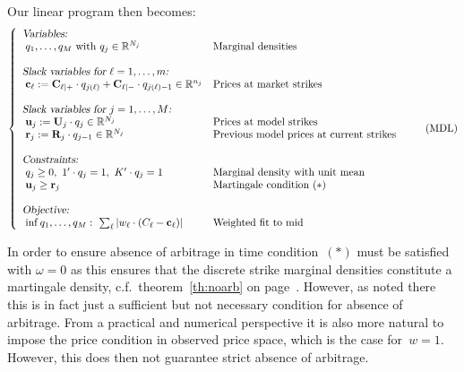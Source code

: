 \documentclass[twoside]{article}
\DeclareRobustCommand{\R}{\mathbb{R}}
\theoremstyle{plain}
\theoremstyle{definition}
\theoremstyle{remark}
\begin{document}
Our linear program then becomes:
\begin{equation}\label{eq:HMOG}
\left\{
    \begin{array}{lll}
        \mbox{\textsl{Variables:}}
        \\
        \hspace{0.1cm}q_1,\ldots,q_M\ \mbox{with} \ q_j \in \R^{N_j} & \mbox{Marginal densities}\\
        \\
        \mbox{\textsl{Slack variables for $\ell=1,\ldots,m$:}}\\
        \hspace{0.1cm}\mathbf{c}_\ell := \mathbf{C}_{\ell|+} \cdot q_{j(\ell)} + \mathbf{C}_{\ell|-} \cdot q_{j(\ell)-1} \in \R^{n_j} & \mbox{Prices at market strikes}\\
        \\
        \mbox{\textsl{Slack variables for $j=1,\ldots,M$:}}\\
        \hspace{0.1cm}\mathbf{u}_j :=  \mathbf{U}_j \cdot q_j  \in \R^{N_j}  & \mbox{Prices at model strikes}\\
        \hspace{0.1cm}\mathbf{r}_j := \mathbf{R}_j \cdot q_{j-1} \in \R^{N_j} & \mbox{Previous model prices at current strikes}\\
        \\
        \mbox{\textsl{Constraints:}} \\
            \hspace{0.1cm}q_j \geq 0 , \ 1'\cdot q_j = 1,  \ K'\cdot q_j = 1 & \mbox{Marginal 
            density with unit mean}\\
            \hspace{0.1cm}\mathbf{u}_j \geq \mathbf{r}_j & \mbox{Martingale 
            condition $(*)$}\\ \\
        \mbox{\textsl{Objective:}} \\
        \hspace{0.1cm}\inf q_1,\ldots,q_M:\ \sum_\ell \left| w_\ell\cdot (C_\ell -\mathbf{c}_\ell)  \right| 
        & \mbox{Weighted fit to mid}
    \end{array}
    \right. \tag{MDL}
\end{equation}

In order to ensure absence of arbitrage in time condition~$(*)$ must be
satisfied with $\omega=0$ as this ensures that the discrete strike marginal
densities constitute a martingale density, c.f.~theorem~\ref{th:noarb}
on page~\pageref{th:noarb}.
However, as noted there this is in fact just a sufficient but not necessary
condition for absence of arbitrage. From a practical and numerical perspective it is also more
natural to impose the price condition in observed price space, which
is the case for~$w=1$. However, this does then not guarantee strict absence of arbitrage.
\end{document}
